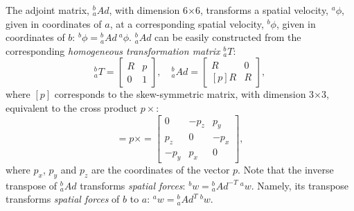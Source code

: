 \documentclass[tog]{acmsiggraph}
\begin{document}
The adjoint matrix, $^{b}_{a}Ad$, with dimension 6$\times$6, transforms a spatial velocity, $^a\phi$, given in coordinates of $a$,
at a corresponding spatial velocity, $^b\phi$, given in coordinates of $b$: $^b\phi = {^{b}_{a}Ad} ~ ^a\phi$.
$^{b}_{a}Ad$ can be easily constructed from the corresponding \textit{homogeneous transformation matrix} $^{b}_{a}T$:
%
\begin{equation}
 ^{b}_{a} T = \left[ \begin{array}{cc} R & p \\   0  & 1 \end{array} \right], \quad
 ^{b}_{a}Ad = \left[ \begin{array}{cc} R & 0 \\ \left[p\right]R & R \end{array} \right],
\end{equation}
%
where $[p]$ corresponds to the skew-symmetric matrix, with dimension 3$\times$3, equivalent to the cross product $p\times$:
%
\begin{equation}
 [p] = p\times = \left[ \begin{array}{ccc} 0 & -p_{z} & p_{y} \\ p_{z} & 0 & -p_{x} \\ -p_{y} & p_{x} & 0  \end{array} \right],
\end{equation}
%
where $p_{x}$, $p_{y}$ and $p_{z}$ are the coordinates of the vector $p$.
%
Note that the inverse transpose of $^{b}_{a}Ad$ transforms \emph{spatial forces}: $^{b}w = {^{b}_{a}Ad^{-T}} ~ ^{a}w$. %
Namely, its transpose transforms \emph{spatial forces} of $b$ to $a$: $^{a}w = {^{b}_{a}Ad^{T}} ~ ^{b}w$.
\end{document}

